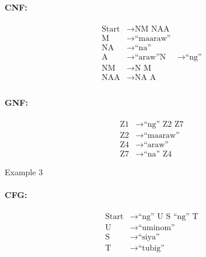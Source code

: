 \paragraph{CNF:}
\begin{equation*}
    \begin{aligned}
        \text{Start}   & \rightarrow \text{NM NAA}   \\
        \text{M} & \rightarrow \text{“maaraw”} \\
        \text{NA} & \rightarrow \text{“na”} \\
        \text{A} & \rightarrow \text{“araw”}
        \text{N} & \rightarrow \text{“ng”} \\
        \text{NM} & \rightarrow \text{N M} \\
        \text{NAA} & \rightarrow \text{NA A} \\
    \end{aligned}
\end{equation*}

\paragraph{GNF:}
\begin{equation*}
    \begin{aligned}
        \text{Z1}   & \rightarrow \text{“ng” Z2 Z7}   \\
        \text{Z2} & \rightarrow \text{“maaraw”} \\
        \text{Z4} & \rightarrow \text{“araw”} \\
        \text{Z7} & \rightarrow \text{“na” Z4}
    \end{aligned}
\end{equation*}

Example 3
\paragraph{CFG:}
\begin{equation*}
    \begin{aligned}
        \text{Start}   & \rightarrow \text{“ng” U S “ng” T}   \\
        \text{U} & \rightarrow \text{“uminom”} \\
        \text{S} & \rightarrow \text{“siya”} \\
        \text{T} & \rightarrow \text{“tubig”}
    \end{aligned}
\end{equation*}

